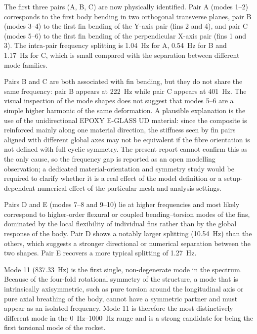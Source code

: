 The first three pairs (A, B, C) are now physically identified. Pair A (modes 1--2) corresponds to the first body bending in two orthogonal transverse planes, pair B (modes 3--4) to the first fin bending of the Y-axis pair (fins 2 and 4), and pair C (modes 5--6) to the first fin bending of the perpendicular X-axis pair (fins 1 and 3). The intra-pair frequency splitting is \SI{1.04}{\hertz} for A, \SI{0.54}{\hertz} for B and \SI{1.17}{\hertz} for C, which is small compared with the separation between different mode families.

Pairs B and C are both associated with fin bending, but they do not share the same frequency: pair B appears at \SI{222}{\hertz} while pair C appears at \SI{401}{\hertz}. The visual inspection of the mode shapes does not suggest that modes 5--6 are a simple higher harmonic of the same deformation. A plausible explanation is the use of the unidirectional EPOXY E-GLASS UD material: since the composite is reinforced mainly along one material direction, the stiffness seen by fin pairs aligned with different global axes may not be equivalent if the fibre orientation is not defined with full cyclic symmetry. The present report cannot confirm this as the only cause, so the frequency gap is reported as an open modelling observation; a dedicated material-orientation and symmetry study would be required to clarify whether it is a real effect of the model definition or a setup-dependent numerical effect of the particular mesh and analysis settings.

Pairs D and E (modes 7--8 and 9--10) lie at higher frequencies and most likely correspond to higher-order flexural or coupled bending--torsion modes of the fins, dominated by the local flexibility of individual fins rather than by the global response of the body. Pair D shows a notably larger splitting (\SI{10.54}{\hertz}) than the others, which suggests a stronger directional or numerical separation between the two shapes. Pair E recovers a more typical splitting of \SI{1.27}{\hertz}.

Mode 11 (\SI{837.33}{\hertz}) is the first single, non-degenerate mode in the spectrum. Because of the four-fold rotational symmetry of the structure, a mode that is intrinsically axisymmetric, such as pure torsion around the longitudinal axis or pure axial breathing of the body, cannot have a symmetric partner and must appear as an isolated frequency. Mode 11 is therefore the most distinctively different mode in the \SIrange{0}{1000}{\hertz} range and is a strong candidate for being the first torsional mode of the rocket.

